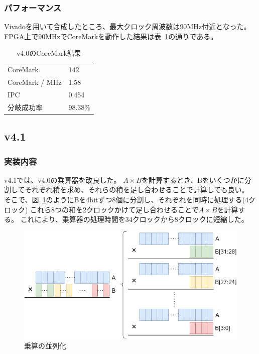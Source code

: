 \documentclass[dvipdfmx,10pt,a4paper,titlepage]{jsarticle}
\begin{document}
    \subsubsection{パフォーマンス}
    Vivadoを用いて合成したところ、最大クロック周波数は$90\mathrm{MHz}$付近となった。
    FPGA上で$90\mathrm{MHz}$でCoreMarkを動作した結果は表~\ref{tab:v4.0}の通りである。
    \begin{table}[h]
        \begin{center}
            \caption{v4.0のCoreMark結果}\label{tab:v4.0}
            \begin{tabular}{ll}
                CoreMark & 142\\
                CoreMark / MHz & 1.58 \\
                IPC & 0.454 \\
                分岐成功率 & 98.38\% \\
            \end{tabular}
        \end{center}
    \end{table}
    \subsection{v4.1}
    \subsubsection{実装内容}
    v4.1では、v4.0の乗算器を改良した。
    $A\times B$を計算するとき、Bをいくつかに分割してそれぞれ積を求め、それらの積を足し合わせることで計算しても良い。
    そこで、図~\ref{fig:multiplier2}のようにBを4bitずつ8個に分割し、それぞれを同時に処理する(4クロック)
    これら8つの和を2クロックかけて足し合わせることで$A\times B$を計算する。
    これにより、乗算器の処理時間を34クロックから8クロックに短縮した。
    \begin{figure}
        \centering
        \includegraphics[width=12cm]{figure/mul_split.png}
        \caption{乗算の並列化}\label{fig:multiplier2}
    \end{figure}
\end{document}
